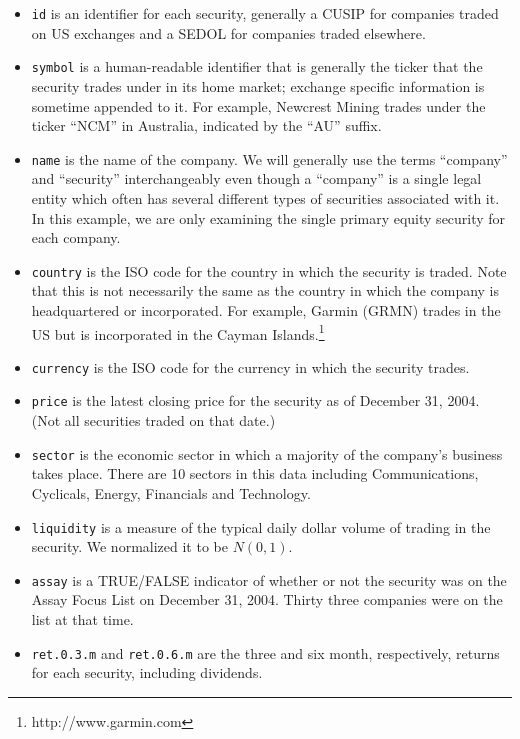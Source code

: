 \documentclass{article}
\begin{document}
\begin{itemize}
  
\item \texttt{id} is an identifier for each security, generally a
  CUSIP for companies traded on US exchanges and a SEDOL for companies
  traded elsewhere.

\item \texttt{symbol} is a human-readable identifier that is generally
  the ticker that the security trades under in its home market;
  exchange specific information is sometime appended to it. For
  example, Newcrest Mining trades under the ticker ``NCM'' in
  Australia, indicated by the ``AU'' suffix.
  
\item \texttt{name} is the name of the company. We will generally use
  the terms ``company'' and ``security'' interchangeably even though a
  ``company'' is a single legal entity which often has several
  different types of securities associated with it. In this example,
  we are only examining the single primary equity security for each
  company.
  
\item \texttt{country} is the ISO code for the country in which the
  security is traded. Note that this is not necessarily the same as
  the country in which the company is headquartered or incorporated.
  For example, Garmin (GRMN) trades in the US but is incorporated
  in the Cayman Islands.\footnote{http://www.garmin.com}
  
\item \texttt{currency} is the ISO code for the currency in which the
  security trades.
  
\item \texttt{price} is the latest closing price for the security as
  of December 31, 2004. (Not all securities traded on that date.)
  
\item \texttt{sector} is the economic sector in which a majority of
  the company's business takes place. There are
  10 sectors in this data including
  Communications, Cyclicals, Energy, Financials and Technology.
  
\item \texttt{liquidity} is a measure of the typical daily dollar
  volume of trading in the security. We normalized it to be $N(0,1)$.
  
\item \texttt{assay} is a TRUE/FALSE indicator of whether or not the
  security was on the Assay Focus List on December 31, 2004. Thirty
  three companies were on the list at that time.
  
\item \texttt{ret.0.3.m} and \texttt{ret.0.6.m} are the three and six
  month, respectively, returns for each security, including dividends.

\end{itemize}
\end{document}
